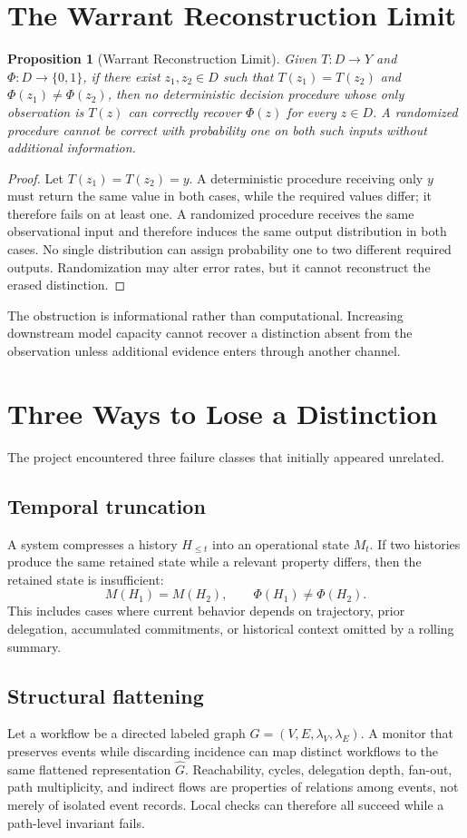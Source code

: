 \documentclass[11pt]{article}
\newtheorem{proposition}{Proposition}
\begin{document}
\section{The Warrant Reconstruction Limit}
\begin{proposition}[Warrant Reconstruction Limit]
Given $T:D\to Y$ and $\Phi:D\to\{0,1\}$, if there exist $z_1,z_2\in D$ such that $T(z_1)=T(z_2)$ and $\Phi(z_1)\neq\Phi(z_2)$, then no deterministic decision procedure whose only observation is $T(z)$ can correctly recover $\Phi(z)$ for every $z\in D$. A randomized procedure cannot be correct with probability one on both such inputs without additional information.
\end{proposition}
\begin{proof}
Let $T(z_1)=T(z_2)=y$. A deterministic procedure receiving only $y$ must return the same value in both cases, while the required values differ; it therefore fails on at least one. A randomized procedure receives the same observational input and therefore induces the same output distribution in both cases. No single distribution can assign probability one to two different required outputs. Randomization may alter error rates, but it cannot reconstruct the erased distinction.
\end{proof}

The obstruction is informational rather than computational. Increasing downstream model capacity cannot recover a distinction absent from the observation unless additional evidence enters through another channel.

\section{Three Ways to Lose a Distinction}
The project encountered three failure classes that initially appeared unrelated.

\subsection{Temporal truncation}
A system compresses a history $H_{\le t}$ into an operational state $M_t$. If two histories produce the same retained state while a relevant property differs, then the retained state is insufficient:
\[
M(H_1)=M(H_2),\qquad \Phi(H_1)\ne\Phi(H_2).
\]
This includes cases where current behavior depends on trajectory, prior delegation, accumulated commitments, or historical context omitted by a rolling summary.

\subsection{Structural flattening}
Let a workflow be a directed labeled graph $G=(V,E,\lambda_V,\lambda_E)$. A monitor that preserves events while discarding incidence can map distinct workflows to the same flattened representation $\widehat G$. Reachability, cycles, delegation depth, fan-out, path multiplicity, and indirect flows are properties of relations among events, not merely of isolated event records. Local checks can therefore all succeed while a path-level invariant fails.
\end{document}
